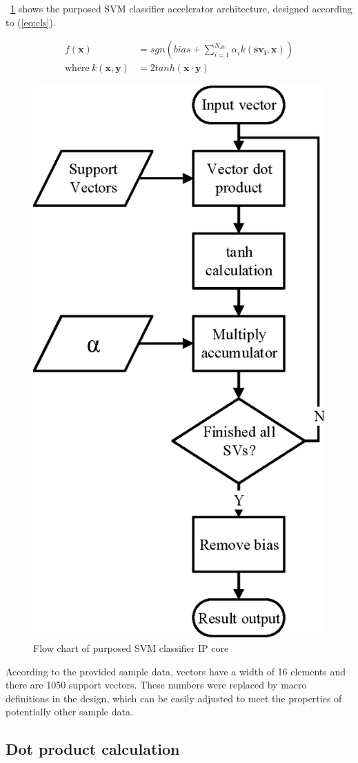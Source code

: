 \documentclass[journal]{IEEEtran}
\newcommand{\fref}[1]{\figurename~\ref{#1}}
\newcommand{\eref}[1]{(\ref{#1})}
\begin{document}
\fref{fig:ip} shows the purposed SVM classifier accelerator architecture, designed according to \eref{eq:cls}.

\begin{align}
	f(\bm{x}) &= sgn \left( bias + \sum_{i=1}^{N_{SV}} \alpha_i k(\bm{{sv}_i}, \bm{x}) \right)
	\label{eq:cls}\\
	\text{where}~k(\bm{x}, \bm{y}) &= 2 tanh(\bm{x} \cdot \bm{y})
\end{align}

\begin{figure}[ht]
	\centering
	\includegraphics[width=0.6\columnwidth]{IP}
	\caption{Flow chart of purposed SVM classifier IP core}
	\label{fig:ip}
\end{figure}

According to the provided sample data, vectors have a width of 16 elements and there are 1050 support vectors. These numbers were replaced by macro definitions in the design, which can be easily adjusted to meet the properties of potentially other sample data.

\subsection{Dot product calculation}
\end{document}
